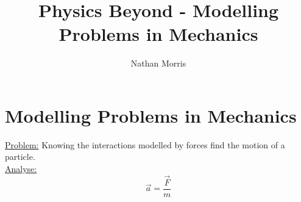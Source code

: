 \documentclass[a4paper, 12pt]{article}
\begin{document}
\title{Physics Beyond - Modelling Problems in Mechanics}
\author{Nathan Morris}
\maketitle

\newpage

\tableofcontents
{}

\newpage

\section{Modelling Problems in Mechanics}
\underline{Problem:} Knowing the interactions modelled by forces find the motion of a particle.\\
\underline{Analyse:}
$$\vec{a} = \frac{\vec{F}}{m}$$
\end{document}

